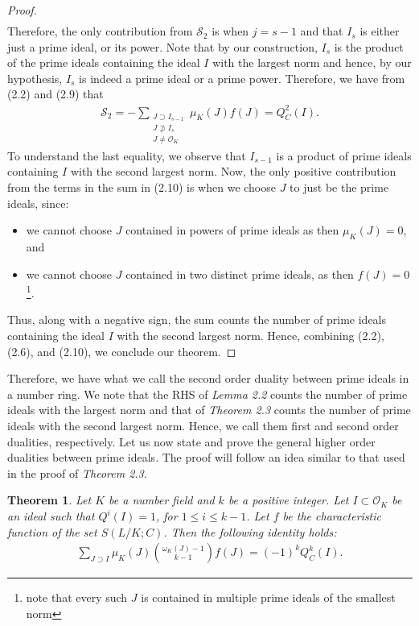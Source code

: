 \documentclass[12pt]{article}
\numberwithin{equation}{section}
\newtheorem{theorem}{Theorem}[section]
\numberwithin{equation}{section}
\begin{document}
\begin{proof}
\begin{align}
\end{align}
Therefore, the only contribution from $\mathcal{S}_2$ is when $j=s-1$ and that $I_s$ is either just a prime ideal, or its power. Note that by our construction, $I_s$ is the product of the prime ideals containing the ideal $I$ with the largest norm and hence, by our hypothesis, $I_s$ is indeed a prime ideal or a prime power. Therefore, we have from (2.2) and (2.9) that
\begin{align}
    \mathcal{S}_2 = -\sum_{\substack{J \supset I_{s-1} \\ J \not \supset I_s \\ J \neq \mathcal{O}_K}} \mu_K(J)f(J) = Q_C^2(I).
\end{align}
To understand the last equality, we observe that $I_{s-1}$ is a product of prime ideals containing $I$ with the second largest norm. Now, the only positive contribution from the terms in the sum in (2.10) is when we choose $J$ to just be the prime ideals, since:
\begin{itemize}
    \item[(i)] we cannot choose $J$ contained in powers of prime ideals as then $\mu_K(J)=0$, and
    \item[(ii)] we cannot choose $J$ contained in two distinct prime ideals, as then $f(J)=0$\footnote[6]{note that every such $J$ is contained in multiple prime ideals of the smallest norm}. 
\end{itemize}
Thus, along with a negative sign, the sum counts the number of prime ideals containing the ideal $I$ with the second largest norm. Hence, combining (2.2), (2.6), and (2.10), we conclude our theorem.
\end{proof}
\noindent Therefore, we have what we call the second order duality between prime ideals in a number ring. We note that the RHS of \textit{Lemma 2.2} counts the number of prime ideals with the largest norm and that of \textit{Theorem 2.3} counts the number of prime ideals with the second largest norm. Hence, we call them first and second order dualities, respectively.  Let us now state and prove the general higher order dualities between prime ideals. The proof will follow an idea similar to that used in the proof of \textit{Theorem 2.3}.
\begin{theorem}
    Let $K$ be a number field and $k$ be a positive integer. Let $I \subset \mathcal{O}_K$ be an ideal such that $Q^i(I)=1$, for $1 \leq i\leq k-1$. Let $f$ be the characteristic function of the set $S(L/K;C)$. Then the following identity holds:
    \begin{align}
        \sum_{J \supset I}\mu_K(J){{\omega_K(J)-1} \choose k-1}f(J) = (-1)^kQ_C^k(I) .\nonumber
    \end{align}
\end{theorem}
\end{document}
